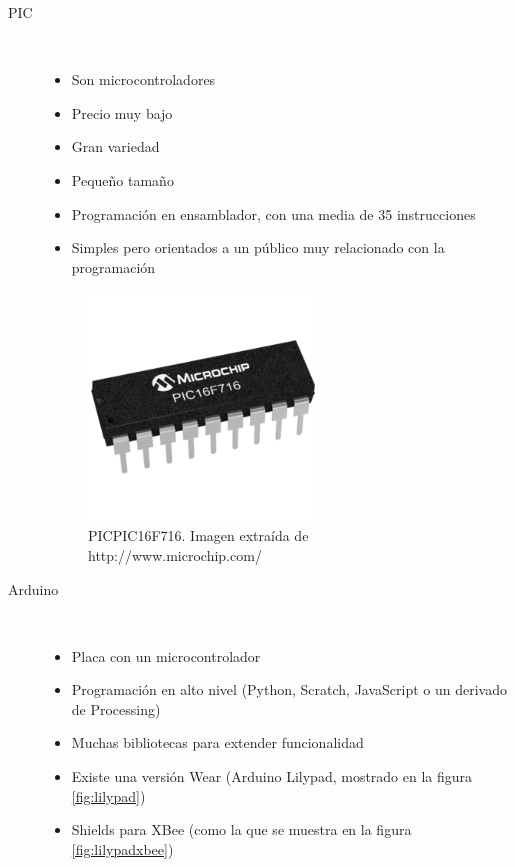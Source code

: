 \begin{description}
  \item[PIC] \hfill \\
    \begin{itemize}
      \item Son microcontroladores
      \item Precio muy bajo
      \item Gran variedad
      \item Pequeño tamaño
      \item Programación en ensamblador, con una media de 35 instrucciones
      \item Simples pero orientados a un público muy relacionado con la programación
    \end{itemize}
    \begin{figure}[!htb]
    \centering
    \includegraphics[width=0.6\textwidth]{./imagenes/pic}
    \caption{PICPIC16F716. Imagen extraída de \scriptsize{http://www.microchip.com/}} \label{fig:pic}
    \end{figure}
  \item[Arduino] \hfill \\
    \begin{itemize}
      \item Placa con un microcontrolador
      \item Programación en alto nivel (Python, Scratch, JavaScript o un derivado de Processing)
      \item Muchas bibliotecas para extender funcionalidad
      \item Existe una versión Wear (Arduino Lilypad, mostrado en la figura \ref{fig:lilypad})
      \item Shields para XBee (como la que se muestra en la figura \ref{fig:lilypadxbee})

\end{itemize}
\end{description}
